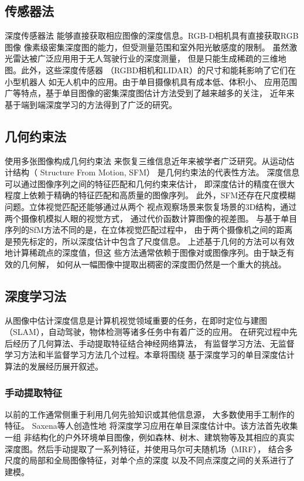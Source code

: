 \subsection{传感器法}
深度传感器法\cite{zhang2012microsoft,yoneda2014lidar}
能够直接获取相应图像的深度信息。RGB-D相机具有直接获取RGB图像
像素级密集深度图的能力，但受测量范围和室外阳光敏感度的限制。
虽然激光雷达被广泛应用用于无人驾驶行业的深度测量，
但是只能生成稀疏的三维地图。此外，这些深度传感器
（RGBD相机和LIDAR）的尺寸和能耗影响了它们在小型机器人
如无人机中的应用。由于单目摄像机具有成本低、体积小、
应用范围广等特点，基于单目图像的密集深度图估计方法受到了越来越多的关注，
近年来基于端到端深度学习的方法得到了广泛的研究。
\subsection{几何约束法}
使用多张图像构成几何约束法
\cite{zou2010method,cao2015summary,ullman1979interpretation}
来恢复三维信息近年来被学者广泛研究。从运动估计结构（
Structure From Motion, SFM）\cite{ullman1979interpretation}
是几何约束法的代表性方法。
深度信息可以通过图像序列之间的特征匹配和几何约束来估计，
即深度估计的精度在很大程度上依赖于精确的特征匹配和高质量的图像序列。
此外，SFM还存在尺度模糊问题。立体视觉匹配还能够通过从两个
视点观察场景来恢复场景的3D结构，通过两个摄像机模拟人眼的视觉方式，
通过代价函数计算图像的视差图。
与基于单目序列的SfM方法不同的是，在立体视觉匹配过程中，
由于两个摄像机之间的距离是预先标定的，所以深度估计中包含了尺度信息。
上述基于几何的方法可以有效地计算稀疏点的深度值，但这
些方法通常依赖于图像对或图像序列。由于缺乏有效的几何解，
如何从一幅图像中提取出稠密的深度图仍然是一个重大的挑战。
\subsection{深度学习法}
从图像中估计深度信息是计算机视觉领域重要的任务，在即时定位与建图
（SLAM），自动驾驶，物体检测等诸多任务中有着广泛的应用。
在研究过程中先后经历了几何算法、手动提取特征结合神经网络算法，
有监督学习方法、无监督学习方法和半监督学习方法几个过程。本章将围绕
基于深度学习的单目深度估计算法的发展经历展开叙述。

\subsubsection{手动提取特征}
以前的工作通常侧重于利用几何先验知识或其他信息源，
大多数使用手工制作的特征。
Saxena等人\cite{saxena2006learning}创造性地
将深度学习应用在单目深度估计中。该方法首先收集一组
非结构化的户外环境单目图像，例如森林、树木、建筑物等及其相应的真实
深度图。然后手动提取了一系列特征，并使用马尔可夫随机场（MRF），
结合多尺度的局部和全局图像特征，对单个点的深度
以及不同点深度之间的关系进行了建模。


